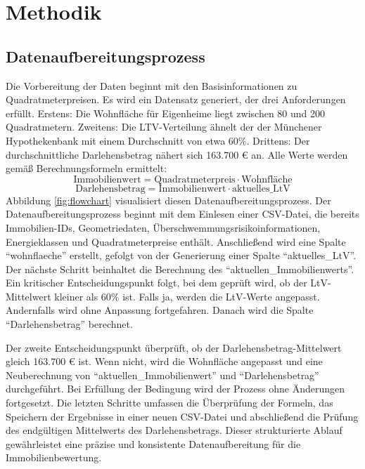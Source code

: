
\section{Methodik}
\subsection{Datenaufbereitungsprozess}
Die Vorbereitung der Daten beginnt mit den Basisinformationen zu Quadratmeterpreisen. Es wird ein Datensatz generiert, der drei Anforderungen erfüllt. Erstens: Die Wohnfläche für Eigenheime liegt zwischen 80 und 200 Quadratmetern. Zweitens: Die LTV-Verteilung ähnelt der der Münchener Hypothekenbank mit einem Durchschnitt von etwa 60\%. Drittens: Der durchschnittliche Darlehensbetrag nähert sich 163.700 € an. Alle Werte werden gemäß Berechnungsformeln ermittelt:
\begin{equation}
    \text{Immobilienwert} = \text{Quadratmeterpreis} \cdot \text{Wohnfläche}
\end{equation}
\begin{equation}
    \text{Darlehensbetrag} = \text{Immobilienwert} \cdot \text{aktuelles\_LtV}
\end{equation}
Abbildung \ref{fig:flowchart} visualisiert diesen Datenaufbereitungsprozess. Der Datenaufbereitungsprozess beginnt mit dem Einlesen einer CSV-Datei, die bereits Immobilien-IDs, Geometriedaten, Überschwemmungsrisikoinformationen, Energieklassen und Quadratmeterpreise enthält. Anschließend wird eine Spalte \enquote{wohnflaeche} erstellt, gefolgt von der Generierung einer Spalte \enquote{aktuelles\_LtV}. Der nächste Schritt beinhaltet die Berechnung des \enquote{aktuellen\_Immobilienwerts}. Ein kritischer Entscheidungspunkt folgt, bei dem geprüft wird, ob der LtV-Mittelwert kleiner als 60\% ist. Falls ja, werden die LtV-Werte angepasst. Andernfalls wird ohne Anpassung fortgefahren. Danach wird die Spalte \enquote{Darlehensbetrag} berechnet.

Der zweite Entscheidungspunkt überprüft, ob der Darlehensbetrag-Mittelwert gleich 163.700 € ist. Wenn nicht, wird die Wohnfläche angepasst und eine Neuberechnung von \enquote{aktuellen\_Immobilienwert} und \enquote{Darlehensbetrag} durchgeführt. Bei Erfüllung der Bedingung wird der Prozess ohne Änderungen fortgesetzt. Die letzten Schritte umfassen die Überprüfung der Formeln, das Speichern der Ergebnisse in einer neuen CSV-Datei und abschließend die Prüfung des endgültigen Mittelwerts des Darlehensbetrags. Dieser strukturierte Ablauf gewährleistet eine präzise und konsistente Datenaufbereitung für die Immobilienbewertung.

